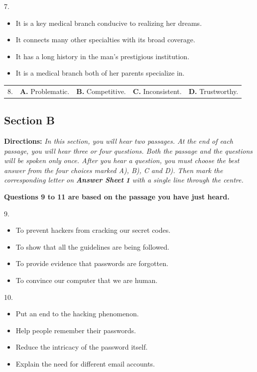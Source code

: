 \documentclass[UTF8,11pt]{ctexart}
\begin{document}
7.


\begin{itemize}[leftmargin=2em,itemsep=.2em,topsep=.4em]\item[A.] It is a key medical branch conducive to realizing her dreams.
\item[B.] It connects many other specialties with its broad coverage.
\item[C.] It has a long history in the man’s prestigious institution.
\item[D.] It is a medical branch both of her parents specialize in.
\end{itemize}

\noindent\begin{tabularx}{\linewidth}{@{}lXXXX@{}}8. & \textbf{A.} Problematic. & \textbf{B.} Competitive. & \textbf{C.} Inconsistent. & \textbf{D.} Trustworthy.\\\end{tabularx}\par

\subsection*{\textbf{Section B}}


\textbf{Directions:} \textit{In this section, you will hear two passages. At the end of each passage, you will hear three or four} \textit{questions. Both the passage and the questions will be spoken only once. After you hear a question, you must choose} \textit{the best answer from the four choices marked A), B), C and D). Then mark the corresponding letter on }\textbf{\textit{Answer Sheet}} \textbf{\textit{1}}\textit{ with a single line through the centre.}


\textbf{Questions 9 to 11 are based on the passage you have just heard.}


9.


\begin{itemize}[leftmargin=2em,itemsep=.2em,topsep=.4em]\item[A.] To prevent hackers from cracking our secret codes.
\item[B.] To show that all the guidelines are being followed.
\item[C.] To provide evidence that passwords are forgotten.
\item[D.] To convince our computer that we are human.
\end{itemize}

10.


\begin{itemize}[leftmargin=2em,itemsep=.2em,topsep=.4em]\item[A.] Put an end to the hacking phenomenon.
\item[B.] Help people remember their passwords.
\item[C.] Reduce the intricacy of the password itself.
\item[D.] Explain the need for different email accounts.
\end{itemize}
\end{document}
